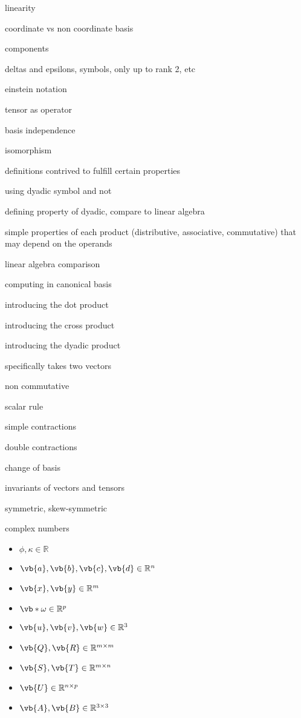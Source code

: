 linearity

coordinate vs non coordinate basis

components

deltas and epsilons, symbols, only up to rank 2, etc

einstein notation

tensor as operator

basis independence

isomorphism

definitions contrived to fulfill certain properties

using dyadic symbol and not

defining property of dyadic, compare to linear algebra

simple properties of each product (distributive, associative, commutative) that may depend on the operands

linear algebra comparison

computing in canonical basis

introducing the dot product

introducing the cross product

introducing the dyadic product

specifically takes two vectors

non commutative

scalar rule

simple contractions

double contractions

change of basis

invariants of vectors and tensors

symmetric, skew-symmetric

complex numbers

\begin{itemize}
	\item $\phi, \kappa \in \mathbb{R}$
	\item $\vb{a}, \vb{b}, \vb{c}, \vb{d} \in \mathbb{R}^{n}$
	\item $\vb{x}, \vb{y} \in \mathbb{R}^{m}$
	\item $\vb*{\omega} \in \mathbb{R}^{p}$
	\item $\vb{u}, \vb{v}, \vb{w} \in \mathbb{R}^{3}$
	\item $\vb{Q}, \vb{R} \in \mathbb{R}^{m \times m}$
	\item $\vb{S}, \vb{T} \in \mathbb{R}^{m \times n}$
	\item $\vb{U} \in \mathbb{R}^{n \times p}$
	\item $\vb{A}, \vb{B} \in \mathbb{R}^{3 \times 3}$
\end{itemize}

